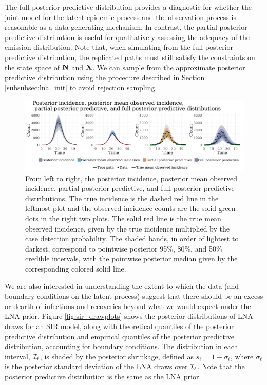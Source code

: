 The full posterior predictive distribution provides a diagnostic for whether the joint model for the latent epidemic process and the observation process is reasonable as a data generating mechanism. In contrast, the partial posterior predictive distribution is useful for qualitatively assessing the adequacy of the emission distribution. Note that, when simulating from the full posterior predictive distribution, the replicated paths must still satisfy the constraints on the state space of $ \mathbf{N} $ and $ \mathbf{X} $. We can sample from the approximate posterior predictive distribution using the procedure described in Section \ref{subsubsec:lna_init} to avoid rejection sampling. 
\begin{figure}[htbp]
	\centering
	\includegraphics[width=\linewidth]{figures/sir_diag_plots}
	\caption[SIR model posterior incidence, posterior mean observed incidence, partial posterior predictive, and full posterior distributions.]{From left to right, the posterior incidence, posterior mean observed incidence, partial posterior predictive, and full posterior predictive distributions. The true incidence is the dashed red line in the leftmost plot and the observed incidence counts are the solid green dots in the right two plots. The solid red line is the true mean observed incidence, given by the true incidence multiplied by the case detection probability. The shaded bands, in order of lightest to darkest, correspond to pointwise posterior 95\%, 80\%, and 50\% credible intervals, with the pointwise posterior median given by the corresponding colored solid line.}
	\label{fig:sirdiagplots}
\end{figure}

We are also interested in understanding the extent to which the data (and boundary conditions on the latent process) suggest that there should be an excess or dearth of infections and recoveries beyond what we would expect under the LNA prior. Figure \ref{fig:sir_drawplots} shows the posterior distributions of LNA draws for an SIR model, along with theoretical quantiles of the posterior predictive distribution and empirical quantiles of the posterior predictive distribution, accounting for boundary conditions. The distribution in each interval, $ \mathcal{I}_\ell $, is shaded by the posterior shrinkage, defined as $ s_\ell = 1 - \sigma_\ell$, where $ \sigma_\ell $ is the posterior standard deviation of the LNA draws over $ \mathcal{I}_\ell $. Note that the posterior predictive distribution is the same as the LNA prior.

